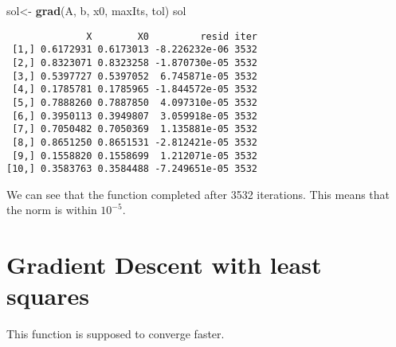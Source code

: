 \documentclass[]{article}
\newenvironment{Shaded}{\begin{snugshade}}{\end{snugshade}}
\newcommand{\KeywordTok}[1]{\textcolor[rgb]{0.13,0.29,0.53}{\textbf{#1}}}
\newcommand{\StringTok}[1]{\textcolor[rgb]{0.31,0.60,0.02}{#1}}
\newcommand{\NormalTok}[1]{#1}
\begin{document}
\begin{Shaded}
\begin{Highlighting}[]
\NormalTok{sol<-}\StringTok{ }\KeywordTok{grad}\NormalTok{(A, b, x0, maxIts, tol)}
\NormalTok{sol}
\end{Highlighting}
\end{Shaded}

\begin{verbatim}
              X        X0         resid iter
 [1,] 0.6172931 0.6173013 -8.226232e-06 3532
 [2,] 0.8323071 0.8323258 -1.870730e-05 3532
 [3,] 0.5397727 0.5397052  6.745871e-05 3532
 [4,] 0.1785781 0.1785965 -1.844572e-05 3532
 [5,] 0.7888260 0.7887850  4.097310e-05 3532
 [6,] 0.3950113 0.3949807  3.059918e-05 3532
 [7,] 0.7050482 0.7050369  1.135881e-05 3532
 [8,] 0.8651250 0.8651531 -2.812421e-05 3532
 [9,] 0.1558820 0.1558699  1.212071e-05 3532
[10,] 0.3583763 0.3584488 -7.249651e-05 3532
\end{verbatim}

We can see that the function completed after 3532 iterations. This means
that the norm is within \(10^{-5}\).

\section{Gradient Descent with least
squares}\label{gradient-descent-with-least-squares}

This function is supposed to converge faster.
\end{document}

